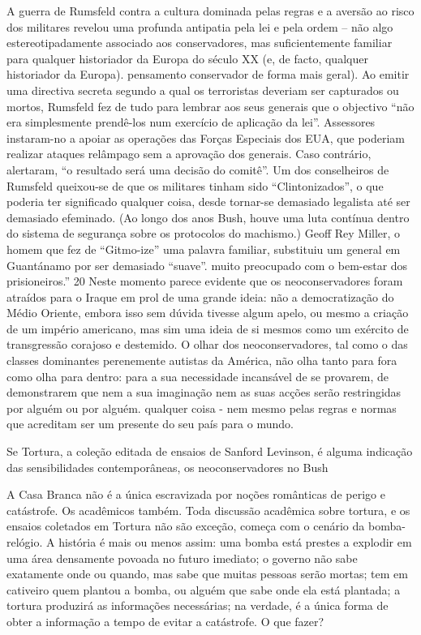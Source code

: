 A guerra de Rumsfeld contra a cultura dominada pelas regras e a aversão ao risco dos militares revelou uma profunda antipatia pela lei e pela ordem – não algo estereotipadamente associado aos conservadores, mas suficientemente familiar para qualquer historiador da Europa do século XX (e, de facto, qualquer historiador da Europa). pensamento conservador de forma mais geral). Ao emitir uma directiva secreta segundo a qual os terroristas deveriam ser capturados ou mortos, Rumsfeld fez de tudo para lembrar aos seus generais que o objectivo “não era simplesmente prendê-los num exercício de aplicação da lei”. Assessores instaram-no a apoiar as operações das Forças Especiais dos EUA, que poderiam realizar ataques relâmpago sem a aprovação dos generais. Caso contrário, alertaram, “o resultado será uma decisão do comitê”. Um dos conselheiros de Rumsfeld queixou-se de que os militares tinham sido “Clintonizados”, o que poderia ter significado qualquer coisa, desde tornar-se demasiado legalista até ser demasiado efeminado. (Ao longo dos anos Bush, houve uma luta contínua dentro do sistema de segurança sobre os protocolos do machismo.) Geoff Rey Miller, o homem que fez de “Gitmo-ize” uma palavra familiar, substituiu um general em Guantánamo por ser demasiado “suave”. muito preocupado com o bem-estar dos prisioneiros.” {\color{blue}20} Neste momento parece evidente que os neoconservadores foram atraídos para o Iraque em prol de uma grande ideia: não a democratização do Médio Oriente, embora isso sem dúvida tivesse algum apelo, ou mesmo a criação de um império americano, mas sim uma ideia de si mesmos como um exército de transgressão corajoso e destemido. O olhar dos neoconservadores, tal como o das classes dominantes perenemente autistas da América, não olha tanto para fora como olha para dentro: para a sua necessidade incansável de se provarem, de demonstrarem que nem a sua imaginação nem as suas acções serão restringidas por alguém ou por alguém. qualquer coisa - nem mesmo pelas regras e normas que acreditam ser um presente do seu país para o mundo.
 \par 
Se Tortura, a coleção editada de ensaios de Sanford Levinson, é alguma indicação das sensibilidades contemporâneas, os neoconservadores no Bush
 \par 
A Casa Branca não é a única escravizada por noções românticas de perigo e catástrofe. Os acadêmicos também. Toda discussão acadêmica sobre tortura, e os ensaios coletados em Tortura não são exceção, começa com o cenário da bomba-relógio. A história é mais ou menos assim: uma bomba está prestes a explodir em uma área densamente povoada no futuro imediato; o governo não sabe exatamente onde ou quando, mas sabe que muitas pessoas serão mortas; tem em cativeiro quem plantou a bomba, ou alguém que sabe onde ela está plantada; a tortura produzirá as informações necessárias; na verdade, é a única forma de obter a informação a tempo de evitar a catástrofe. O que fazer?
